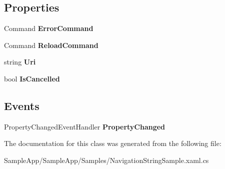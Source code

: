 \subsection*{Properties}
\begin{DoxyCompactItemize}
\item 
\mbox{\label{class_sample_app_1_1_samples_1_1_navigation_string_sample_1_1_navigation_events_view_model_a376e8127391a596e77da144f0559a53d}} 
Command {\bfseries Error\+Command}
\item 
\mbox{\label{class_sample_app_1_1_samples_1_1_navigation_string_sample_1_1_navigation_events_view_model_a4ea489af9f7665cf7b6188b0e4256cab}} 
Command {\bfseries Reload\+Command}
\item 
\mbox{\label{class_sample_app_1_1_samples_1_1_navigation_string_sample_1_1_navigation_events_view_model_a24b4f1a12a74f35d222453611c7c6f35}} 
string {\bfseries Uri}
\item 
\mbox{\label{class_sample_app_1_1_samples_1_1_navigation_string_sample_1_1_navigation_events_view_model_af2b4fd0503b3b57d6083954b04437e79}} 
bool {\bfseries Is\+Cancelled}
\end{DoxyCompactItemize}
\subsection*{Events}
\begin{DoxyCompactItemize}
\item 
\mbox{\label{class_sample_app_1_1_samples_1_1_navigation_string_sample_1_1_navigation_events_view_model_a03bf7e882f75d5768278112ab6f5e2ed}} 
Property\+Changed\+Event\+Handler {\bfseries Property\+Changed}
\end{DoxyCompactItemize}


The documentation for this class was generated from the following file\+:\begin{DoxyCompactItemize}
\item 
Sample\+App/\+Sample\+App/\+Samples/Navigation\+String\+Sample.\+xaml.\+cs\end{DoxyCompactItemize}
